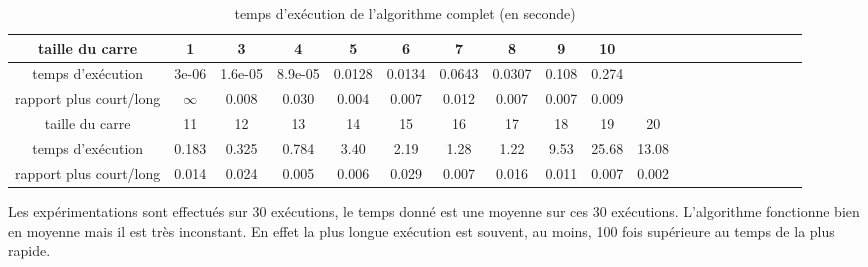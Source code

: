 \documentclass[12pt,a4paper]{article}
\begin{document}
\begin{table}[!h]
\centering
\begin{tabular}{|*{20}{c|}}
  \hline
  taille du carre & 1 & 3 & 4 & 5 & 6 & 7 & 8 & 9 & 10  \\
  \hline
  temps d’exécution & 3e-06 & 1.6e-05 & 8.9e-05 & 0.0128 & 0.0134 & 0.0643 & 0.0307 & 0.108 & 0.274 \\
  \hline
  rapport plus court/long & $\infty$ & 0.008 & 0.030 & 0.004 & 0.007 & 0.012 & 0.007 & 0.007 & 0.009 \\
  \hline
  taille du carre & 11 & 12 & 13 & 14 & 15 & 16 & 17 & 18 & 19 & 20  \\
  \hline
  temps d’exécution  & 0.183 & 0.325 & 0.784 & 3.40 & 2.19 & 1.28 & 1.22 & 9.53 & 25.68 & 13.08 \\
  \hline
  rapport plus court/long & 0.014 & 0.024 & 0.005 & 0.006 & 0.029 & 0.007 & 0.016 & 0.011 & 0.007 & 0.002\\
  \hline
\end{tabular}
\caption{temps d’exécution de l'algorithme complet (en seconde)}
\label{complet}
\end{table}


Les expérimentations sont effectués sur 30 exécutions, le temps donné est une moyenne sur ces 30 exécutions.
L'algorithme fonctionne bien en moyenne mais il est très inconstant. En effet la plus longue exécution est souvent, au moins, 100 fois supérieure au temps de la plus rapide. 
\end{document}
